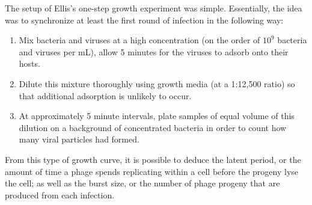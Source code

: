 \documentclass[12pt,twoside]{mitthesis-manusdown}
\begin{document}
The setup of Ellis's one-step growth experiment was simple. Essentially,
the idea was to synchronize at least the first round of infection in the
following way:
\begin{enumerate}
\def\labelenumi{\arabic{enumi}.}
\item
  Mix bacteria and viruses at a high concentration (on the order of
  \(10^9\) bacteria and viruses per mL), allow 5 minutes for the viruses
  to adsorb onto their hosts.
\item
  Dilute this mixture thoroughly using growth media (at a 1:12,500
  ratio) so that additional adsorption is unlikely to occur.
\item
  At approximately 5 minute intervals, plate samples of equal volume of
  this dilution on a background of concentrated bacteria in order to
  count how many viral particles had formed.
\end{enumerate}
From this type of growth curve, it is possible to deduce the latent
period, or the amount of time a phage spends replicating within a cell
before the progeny lyse the cell; as well as the burst size, or the
number of phage progeny that are produced from each infection.
\end{document}
